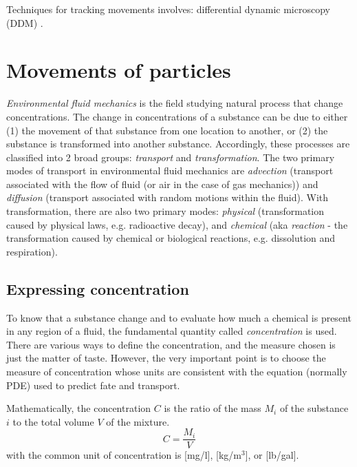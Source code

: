 Techniques for tracking movements involves: differential dynamic microscopy
(DDM) \citep{martinez2012}.

\section{Movements of particles}
\label{sec:movements-particles}


{\it Environmental fluid mechanics} is the field studying natural
process that change concentrations. The change in concentrations of a
substance can be due to either (1) the movement of that substance from
one location to another, or (2) the substance is transformed into
another substance. Accordingly, these processes are classified into 2
broad groups: {\it transport} and {\it transformation}. The two
primary modes of transport in environmental fluid mechanics are
{\it advection} (transport associated with the flow of fluid (or air
in the case of gas mechanics)) and {\it diffusion} (transport
associated with random motions within the fluid).  With
transformation, there are also two primary modes: {\it physical}
(transformation caused by physical laws, e.g. radioactive decay), and
{\it chemical} (aka {\it reaction} - the transformation caused by
chemical or biological reactions, e.g. dissolution and respiration).

\subsection{Expressing concentration}
\label{sec:expr-conc}

To know that a substance change and to evaluate how much a chemical is
present in any region of a fluid, the fundamental quantity called
{\it concentration} is used. There are various ways to define the
concentration, and the measure chosen is just the matter of
taste. However, the very important point is to choose the measure of
concentration whose units are consistent with the equation (normally
PDE) used to predict fate and transport.

Mathematically, the concentration $C$ is the ratio of the mass $M_i$
of the substance $i$ to the total volume $V$ of the mixture.
\begin{equation}
  \label{eq:167}
  C = \frac{M_i}{V}
\end{equation}
with the common unit of concentration is [mg/l], [kg/m$^3$], or
[lb/gal]. 

